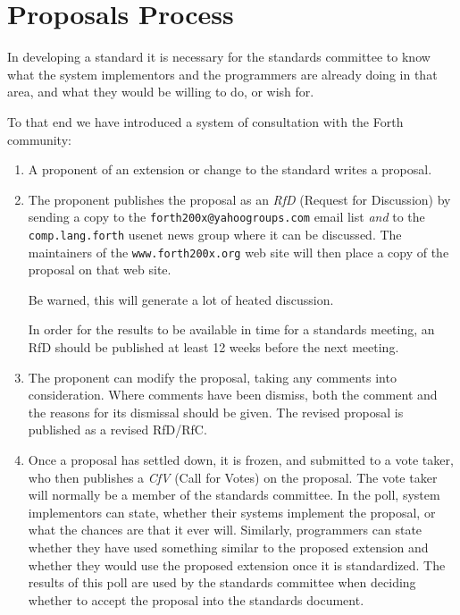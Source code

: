 \chapter*{Proposals Process}
\label{process}

In developing a standard it is necessary for the standards committee to
know what the system implementors and the programmers are already doing
in that area, and what they would be willing to do, or wish for.

To that end we have introduced a system of consultation with the Forth
community:

\begin{enumerate}
\item
	A proponent of an extension or change to the standard writes a
	proposal.

\item
	The proponent publishes the proposal as an \emph{RfD} (Request for
	Discussion) by sending a copy to the \texttt{forth200x@yahoogroups.com}
	email list \emph{and} to the \texttt{comp.lang.forth} usenet news group
	where it can be discussed.  The maintainers of the
	\texttt{www.forth200x.org} web site will then place a copy of the
	proposal on that web site.

	Be warned, this will generate a lot of heated discussion.

	In order for the results to be available in time for a standards
	meeting, an RfD should be published at least 12 weeks before the
	next meeting.


\item
	The proponent can modify the proposal, taking any comments into
	consideration.  Where comments have been dismiss, both the comment
	and the reasons for its dismissal should be given.  The revised
	proposal is published as a revised RfD/RfC.

\item
	Once a proposal has settled down, it is frozen, and submitted to a
	vote taker, who then publishes a \emph{CfV} (Call for Votes) on the
	proposal. The vote taker will normally be a member of the standards
	committee.  In the poll, system implementors can state, whether
	their systems implement the proposal, or what the chances are that
	it ever will.  Similarly, programmers can state whether they have
	used something similar to the proposed extension and whether they
	would use the proposed extension once it is standardized.  The
	results of this poll are used by the standards committee when
	deciding whether to accept the proposal into the standards document.


\end{enumerate}
